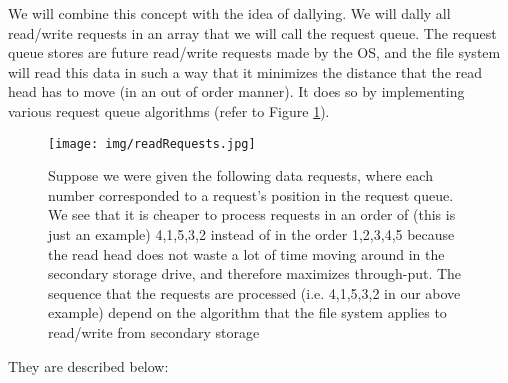 \documentclass[a4paper]{article}
\begin{document}
\begin{enumerate}
We will combine this concept with the idea of dallying. We will dally all read/write requests in an array that we will call the request queue. The request queue stores are future read/write requests made by the OS, and the file system will read this data in such a way that it minimizes the distance that the read head has to move (in an out of order manner). It does so by implementing various request queue algorithms (refer to Figure \ref{fig:ReqQueue}).
\begin{figure}
\centering
\texttt{[image: img/readRequests.jpg]}
\caption{\label{fig:ReqQueue}Suppose we were given the following data requests, where each number corresponded to a request's position in the request queue. We see that it is cheaper to process requests in an order of (this is just an example) 4,1,5,3,2 instead of in the order 1,2,3,4,5 because the read head does not waste a lot of time moving around in the secondary storage drive, and therefore maximizes through-put. The sequence that the requests are processed (i.e. 4,1,5,3,2 in our above example) depend on the algorithm that the file system applies to read/write from secondary storage}
\end{figure}
They are described below:


\end{enumerate}
\end{document}
